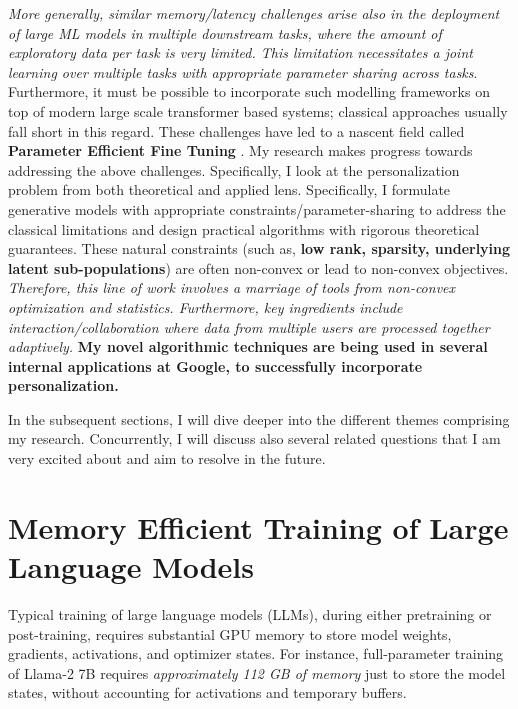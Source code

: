 \documentclass[11pt,a4paper,sans,usenames,dvipsnames]{moderncv} %
\begin{document}
\textit{More generally, similar memory/latency challenges arise also in the deployment of large ML models in multiple downstream tasks, where the amount of exploratory data per task is very limited. This limitation necessitates a joint learning over multiple tasks with appropriate parameter sharing across tasks}. Furthermore, it must be possible to incorporate such modelling frameworks on top of modern large scale transformer based systems; classical approaches usually fall short in this regard. These challenges have led to a nascent field called \textbf{Parameter Efficient Fine Tuning} \cite{lialin2023scaling}.
My research makes progress towards addressing the above challenges.
Specifically, I look at the personalization problem from both theoretical and applied lens. Specifically, I formulate generative models with appropriate constraints/parameter-sharing to address the classical limitations and design practical algorithms with rigorous theoretical guarantees. These natural constraints (such as, \textbf{low rank, sparsity, underlying latent sub-populations}) are often non-convex or lead to non-convex objectives.
\textit{Therefore, this line of work involves a marriage of tools from non-convex optimization and statistics. Furthermore, key ingredients include interaction/collaboration where data from multiple users are processed together adaptively.}  \textbf{My novel algorithmic techniques are being used in several internal applications at Google, to successfully incorporate personalization.}


In the subsequent sections, I will dive deeper into the different themes comprising my research. Concurrently, I will discuss also several related questions that I am very excited about and aim to resolve in the future.

\section{Memory Efficient Training of Large Language Models}\label{sec:scalable}

Typical training of large language models (LLMs), during either pretraining or post-training, requires substantial GPU memory to store model weights, gradients, activations, and optimizer states. For instance, full-parameter training of Llama-2 7B \cite{touvron2023llama} requires \emph{approximately 112 GB of memory} just to store the model states, without accounting for activations and temporary buffers.
\end{document}
